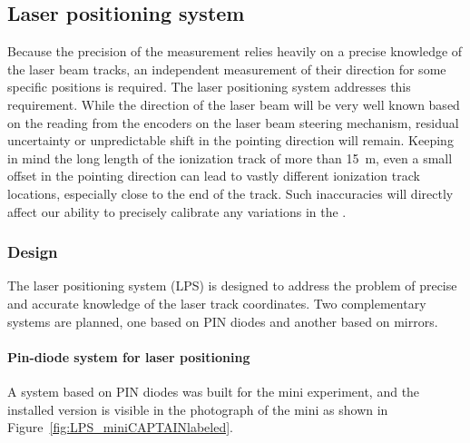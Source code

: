 
\subsection{Laser positioning system}
\label{sec:calib-laser-pos}

Because the precision of the \efield measurement relies heavily on a precise knowledge of the laser beam tracks, an independent measurement of their direction for some specific positions is required. The laser positioning system addresses this requirement.
While the direction of the laser beam will be very well known based on the reading from the encoders on the laser beam steering mechanism,  residual uncertainty or unpredictable shift in the pointing direction will remain. 
Keeping in mind the long length of the ionization track of more than \SI{15}{\m}, even a small offset in the pointing direction can lead to vastly different ionization track locations, especially close to the end of the track. Such inaccuracies will directly affect our ability to precisely calibrate any variations in the \efield.

\subsubsection{Design}

The laser positioning system (LPS)  is designed to address the problem of precise and accurate knowledge of the laser track coordinates. %
Two complementary systems are planned, one based on PIN diodes and another based on mirrors.

\paragraph{Pin-diode system for laser positioning}

A system based on PIN diodes 
was built for the mini experiment,  and the installed version is visible in the photograph of the mini  as shown in  Figure~\ref{fig:LPS_miniCAPTAINlabeled}.  


